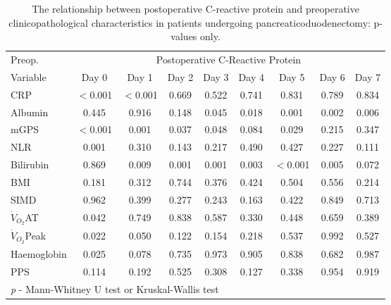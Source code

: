 \begin{table}[p]
	\caption{The relationship  between postoperative C-reactive protein and preoperative clinicopathological characteristics in patients undergoing pancreaticoduodenectomy: p-values only. }
	\label{table:sirs_crp_pvalues}
	\centering
	\renewcommand{\arraystretch}{1.2} %

	\begin{tabular}{|l | c c c c c c c c|}
		\hline
		Preop.              &         \multicolumn{8}{c|}{Postoperative C-Reactive Protein}          \\
		Variable            & Day 0    & Day 1    & Day 2 & Day 3 & Day 4 & Day 5    & Day 6 & Day 7 \\ \hline
		CRP                 & $<$0.001 & $<$0.001 & 0.669 & 0.522 & 0.741 & 0.831    & 0.789 & 0.834 \\
		Albumin             & 0.445    & 0.916    & 0.148 & 0.045 & 0.018 & 0.001    & 0.002 & 0.006 \\
		mGPS                & $<$0.001 & 0.001    & 0.037 & 0.048 & 0.084 & 0.029    & 0.215 & 0.347 \\
		NLR                 & 0.001    & 0.310    & 0.143 & 0.217 & 0.490 & 0.427    & 0.227 & 0.111 \\
		Bilirubin           & 0.869    & 0.009    & 0.001 & 0.001 & 0.003 & $<$0.001 & 0.005 & 0.072 \\
		BMI                 & 0.181    & 0.312    & 0.744 & 0.376 & 0.424 & 0.504    & 0.556 & 0.214 \\
		SIMD                & 0.962    & 0.399    & 0.277 & 0.243 & 0.163 & 0.422    & 0.849 & 0.713 \\
		$\dot{V}_{O_2}$AT   & 0.042    & 0.749    & 0.838 & 0.587 & 0.330 & 0.448    & 0.659 & 0.389 \\
		$\dot{V}_{O_2}$Peak & 0.022    & 0.050    & 0.122 & 0.154 & 0.218 & 0.537    & 0.992 & 0.527 \\
		Haemoglobin         & 0.025    & 0.078    & 0.735 & 0.973 & 0.905 & 0.838    & 0.682 & 0.987 \\
		PPS                 & 0.114    & 0.192    & 0.525 & 0.308 & 0.127 & 0.338    & 0.954 & 0.919 \\ \hline
		\multicolumn{9}{l}{\textit{p} - Mann-Whitney U test or Kruskal-Wallis test}
	\end{tabular}	
\end{table}